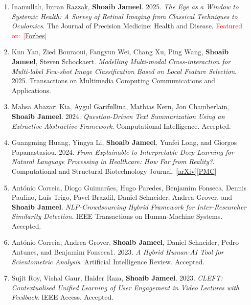 \documentclass[margin]{res}
\begin{document}
\begin{resume}
\begin{enumerate}
    \item Inamullah, Imran Razzak, \textbf{Shoaib Jameel}. 2025. \textit{The Eye as a Window to Systemic Health: A Survey of Retinal Imaging from Classical Techniques to Oculomics}. The Journal of Precision Medicine: Health and Disease. \textcolor{red}{Featured on: [\href{https://www.forbes.com/sites/williamhaseltine/2025/11/05/how-artificial-intelligence-makes-eye-exams-a-gateway-to-whole-body-wellness/}{Forbes}]} \\
    \item Kun Yan, Zied Bouraoui, Fangyun Wei, Chang Xu, Ping Wang, \textbf{Shoaib Jameel}, Steven Schockaert. \textit{Modelling Multi-modal Cross-interaction for Multi-label Few-shot Image Classification Based on Local Feature Selection}. 2025. Transactions on Multimedia Computing Communications and Applications. \newline
    \item Mahsa Abazari Kia, Aygul Garifullina, Mathias Kern, Jon Chamberlain, \textbf{Shoaib Jameel}. 2024. \textit{Question-Driven Text Summarization Using an Extractive-Abstractive Framework}. Computational Intelligence. Accepted. \newline
    \item Guangming Huang, Yingya Li, \textbf{Shoaib Jameel}, Yunfei Long, and Giorgos Papanastasiou. 2024. \textit{From Explainable to Interpretable Deep Learning for Natural Language Processing in Healthcare: How Far from Reality?}. Computational
 and Structural Biotechnology Journal. [\href{https://arxiv.org/abs/2403.11894}{arXiv}][\href{https://pmc.ncbi.nlm.nih.gov/articles/PMC11126530/}{PMC}] \newline
    \item Ant\'onio Correia, Diogo Guimar\~aes, Hugo Paredes, Benjamim Fonseca, Dennis Paulino, Lu\'is Trigo, Pavel Brazdil, Daniel Schneider, Andrea Grover, and \textbf{Shoaib Jameel}. \textit{NLP-Crowdsourcing Hybrid Framework for Inter-Researcher Similarity Detection}. IEEE Transactions on Human-Machine Systems. Accepted. \newline
    \item Ant\'onio Correia, Andrea Grover, \textbf{Shoaib Jameel}, Daniel Schneider, Pedro Antunes, and Benjamim Fonseca1. 2023. \textit{A Hybrid Human-AI Tool for Scientometric Analysis}. Artificial Intelligence Review. Accepted. \newline
    \item Sujit Roy, Vishal Gaur, Haider Raza, \textbf{Shoaib Jameel}. 2023. \textit{CLEFT: Contextualised Unified Learning of User Engagement in Video Lectures with Feedback}.  IEEE Access. Accepted. \newline

\end{enumerate}
\end{resume}
\end{document}

